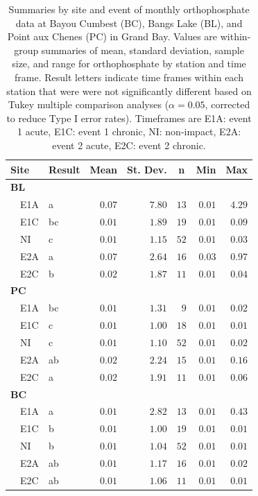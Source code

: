 \documentclass[letterpaper,12pt]{article}\usepackage[]{graphicx}\usepackage[]{color}
\begin{document}
\begin{table}[!tbp]
\caption{Summaries by site and event of monthly orthophosphate data at Bayou Cumbest (BC), Bangs Lake (BL), and Point aux Chenes (PC) in Grand Bay.  Values are within-group summaries of mean, standard deviation, sample size, and range for orthophosphate by station and time frame.  Result letters indicate time frames within each station that were were not significantly different based on Tukey multiple comparison analyses ($\alpha = 0.05$, corrected to reduce Type I error rates). Timeframes are E1A: event 1 acute, E1C: event 1 chronic, NI: non-impact, E2A: event 2 acute, E2C: event 2 chronic.\label{tab:orthtab}} 
\begin{center}
\begin{tabular}{llrrrrr}
\hline\hline
\multicolumn{1}{l}{Site}&\multicolumn{1}{c}{Result}&\multicolumn{1}{c}{Mean}&\multicolumn{1}{c}{St. Dev.}&\multicolumn{1}{c}{n}&\multicolumn{1}{c}{Min}&\multicolumn{1}{c}{Max}\tabularnewline
\hline
{\bfseries BL}&&&&&&\tabularnewline
~~E1A&a&$0.07$&$7.80$&$13$&$0.01$&$4.29$\tabularnewline
~~E1C&bc&$0.01$&$1.89$&$19$&$0.01$&$0.09$\tabularnewline
~~NI&c&$0.01$&$1.15$&$52$&$0.01$&$0.03$\tabularnewline
~~E2A&a&$0.07$&$2.64$&$16$&$0.03$&$0.97$\tabularnewline
~~E2C&b&$0.02$&$1.87$&$11$&$0.01$&$0.04$\tabularnewline
\hline
{\bfseries PC}&&&&&&\tabularnewline
~~E1A&bc&$0.01$&$1.31$&$ 9$&$0.01$&$0.02$\tabularnewline
~~E1C&c&$0.01$&$1.00$&$18$&$0.01$&$0.01$\tabularnewline
~~NI&c&$0.01$&$1.10$&$52$&$0.01$&$0.02$\tabularnewline
~~E2A&ab&$0.02$&$2.24$&$15$&$0.01$&$0.16$\tabularnewline
~~E2C&a&$0.02$&$1.91$&$11$&$0.01$&$0.06$\tabularnewline
\hline
{\bfseries BC}&&&&&&\tabularnewline
~~E1A&a&$0.01$&$2.82$&$13$&$0.01$&$0.43$\tabularnewline
~~E1C&b&$0.01$&$1.00$&$19$&$0.01$&$0.01$\tabularnewline
~~NI&b&$0.01$&$1.04$&$52$&$0.01$&$0.01$\tabularnewline
~~E2A&ab&$0.01$&$1.17$&$16$&$0.01$&$0.02$\tabularnewline
~~E2C&ab&$0.01$&$1.06$&$11$&$0.01$&$0.01$\tabularnewline
\hline
\end{tabular}\end{center}

\end{table}

\clearpage
\end{document}
